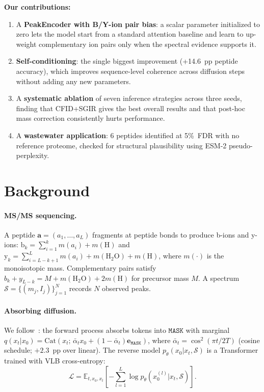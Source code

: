 \documentclass{article}
\newcommand{\vect}[1]{\mathbf{#1}}
\newcommand{\E}{\mathbb{E}}
\newcommand{\Cat}{\mathrm{Cat}}
\newcommand{\MASK}{\texttt{MASK}}
\begin{document}
\textbf{Our contributions:}
\begin{enumerate}[leftmargin=*, itemsep=2pt, topsep=2pt]
  \item A \textbf{PeakEncoder with B/Y-ion pair bias}:
        a scalar parameter initialized to zero lets the model start from a standard attention baseline
        and learn to up-weight complementary ion pairs only when the spectral evidence supports it.
  \item \textbf{Self-conditioning}: the single biggest improvement (+14.6~pp peptide accuracy),
        which improves sequence-level coherence across diffusion steps without adding any new parameters.
  \item A \textbf{systematic ablation} of seven inference strategies across three seeds,
        finding that CFID+SGIR gives the best overall results and that post-hoc mass correction
        consistently hurts performance.
  \item A \textbf{wastewater application}: 6 peptides identified at 5\%~FDR with no reference
        proteome, checked for structural plausibility using ESM-2 pseudo-perplexity.
\end{enumerate}

\section{Background}

\paragraph{MS/MS sequencing.}
A peptide $\vect{a} = (a_1,\ldots,a_L)$ fragments at peptide bonds to produce b-ions and y-ions:
$\text{b}_k = \sum_{i=1}^k m(a_i) + m(\text{H})$ and
$\text{y}_k = \sum_{i=L-k+1}^L m(a_i) + m(\text{H}_2\text{O}) + m(\text{H})$,
where $m(\cdot)$ is the monoisotopic mass.
Complementary pairs satisfy $b_k + y_{L-k} = M + m(\text{H}_2\text{O}) + 2m(\text{H})$
for precursor mass $M$.
A spectrum $\mathcal{S} = \{(m_j, I_j)\}_{j=1}^N$ records $N$ observed peaks.

\paragraph{Absorbing diffusion.}
We follow~\citet{austin2021structured}: the forward process absorbs tokens into $\MASK$ with marginal
$q(x_t|x_0) = \Cat(x_t;\,\bar\alpha_t x_0 + (1-\bar\alpha_t)\vect{e}_\MASK)$,
where $\bar\alpha_t = \cos^2(\pi t / 2T)$ (cosine schedule; $+2.3$~pp over linear).
The reverse model $p_\theta(x_0|x_t,\mathcal{S})$ is a Transformer trained with VLB cross-entropy:
\begin{equation}
  \mathcal{L} = \E_{t,x_0,x_t}\!\left[-\textstyle\sum_{l=1}^{L}\log p_\theta(x_0^{(l)}|x_t,\mathcal{S})\right].
  \label{eq:elbo}
\end{equation}
\end{document}
